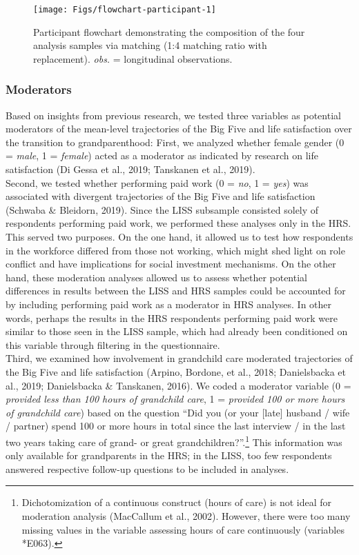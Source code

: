 \documentclass[
  english,
  man, noextraspace,floatsintext]{apa7}
\begin{document}
\begin{figure}

{\centering \texttt{[image: Figs/flowchart-participant-1]} 

}

\caption{Participant flowchart demonstrating the composition of the four analysis samples via matching (1:4 matching ratio with replacement). \emph{obs.} = longitudinal observations.}\label{fig:flowchart-participant}
\end{figure}

\hypertarget{moderators}{%
\subsubsection{Moderators}\label{moderators}}

Based on insights from previous research, we tested three variables as potential moderators of the mean-level trajectories of the Big Five and life satisfaction over the transition to grandparenthood: First, we analyzed whether female gender (0 = \emph{male}, 1 = \emph{female}) acted as a moderator as indicated by research on life satisfaction (Di Gessa et al., 2019; Tanskanen et al., 2019).\\
Second, we tested whether performing paid work (0 = \emph{no}, 1 = \emph{yes}) was associated with divergent trajectories of the Big Five and life satisfaction (Schwaba \& Bleidorn, 2019). Since the LISS subsample consisted solely of respondents performing paid work, we performed these analyses only in the HRS. This served two purposes. On the one hand, it allowed us to test how respondents in the workforce differed from those not working, which might shed light on role conflict and have implications for social investment mechanisms. On the other hand, these moderation analyses allowed us to assess whether potential differences in results between the LISS and HRS samples could be accounted for by including performing paid work as a moderator in HRS analyses. In other words, perhaps the results in the HRS respondents performing paid work were similar to those seen in the LISS sample, which had already been conditioned on this variable through filtering in the questionnaire.\\
Third, we examined how involvement in grandchild care moderated trajectories of the Big Five and life satisfaction (Arpino, Bordone, et al., 2018; Danielsbacka et al., 2019; Danielsbacka \& Tanskanen, 2016). We coded a moderator variable (0 = \emph{provided less than 100 hours of grandchild care}, 1 = \emph{provided 100 or more hours of grandchild care}) based on the question \enquote{Did you (or your {[}late{]} husband / wife / partner) spend 100 or more hours in total since the last interview / in the last two years taking care of grand- or great grandchildren?}.\footnote{Dichotomization of a continuous construct (hours of care) is not ideal for moderation analysis (MacCallum et al., 2002). However, there were too many missing values in the variable assessing hours of care continuously (variables *E063).} This information was only available for grandparents in the HRS; in the LISS, too few respondents answered respective follow-up questions to be included in analyses.
\end{document}
